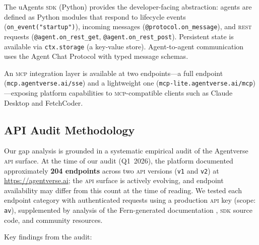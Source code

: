 \documentclass[twoside,11pt]{article}
\begin{document}
The uAgents \textsc{sdk} (Python) \citep{uagents2026sdk} provides the developer-facing abstraction:
agents are defined as Python modules that respond to lifecycle events
(\texttt{on\_event("startup")}), incoming messages
(\texttt{@protocol.on\_message}), and \textsc{rest} requests
(\texttt{@agent.on\_rest\_get}, \texttt{@agent.on\_rest\_post}).  Persistent
state is available via \texttt{ctx.storage} (a key-value store).
Agent-to-agent communication uses the Agent Chat Protocol with typed message
schemas.

An \textsc{mcp} integration layer is available at two endpoints---a full
endpoint (\texttt{mcp.agentverse.ai/sse}) and a lightweight one
(\texttt{mcp-lite.agentverse.ai/mcp})---exposing
platform capabilities to \textsc{mcp}-compatible clients such as Claude
Desktop and FetchCoder.

\subsection{API Audit Methodology}
\label{subsec:audit}

Our gap analysis is grounded in a systematic empirical audit of the Agentverse
\textsc{api} surface.  At the time of our audit (Q1~2026), the platform
documented approximately \textbf{204 endpoints} across two \textsc{api}
versions (\texttt{v1} and \texttt{v2}) at \url{https://agentverse.ai};
the \textsc{api} surface is actively evolving, and endpoint availability may
differ from this count at the time of reading.  We tested each endpoint category with authenticated requests using a
production \textsc{api} key (scope: \texttt{av}), supplemented by analysis of
the Fern-generated documentation \citep{agentverse2026docs}, \textsc{sdk}
source code, and community resources.

Key findings from the audit:
\end{document}

